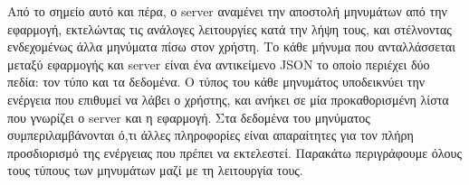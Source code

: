 \documentclass[../thesis.tex]{subfiles}
\begin{document}
Από το σημείο αυτό και πέρα, ο server αναμένει την αποστολή μηνυμάτων από την εφαρμογή, εκτελώντας τις ανάλογες λειτουργίες κατά την λήψη τους, και στέλνοντας ενδεχομένως άλλα μηνύματα πίσω στον χρήστη.
Το κάθε μήνυμα που ανταλλάσσεται μεταξύ εφαρμογής και server είναι ένα αντικείμενο JSON το οποίο περιέχει δύο πεδία: τον τύπο και τα δεδομένα.
Ο τύπος του κάθε μηνυμάτος υποδεικνύει την ενέργεια που επιθυμεί να λάβει ο χρήστης, και ανήκει σε μία προκαθορισμένη λίστα που γνωρίζει ο server και η εφαρμογή.
Στα δεδομένα του μηνύματος συμπεριλαμβάνονται ό,τι άλλες πληροφορίες είναι απαραίτητες για τον πλήρη προσδιορισμό της ενέργειας που πρέπει να εκτελεστεί.
Παρακάτω περιγράφουμε όλους τους τύπους των μηνυμάτων μαζί με τη λειτουργία τους.
\end{document}
